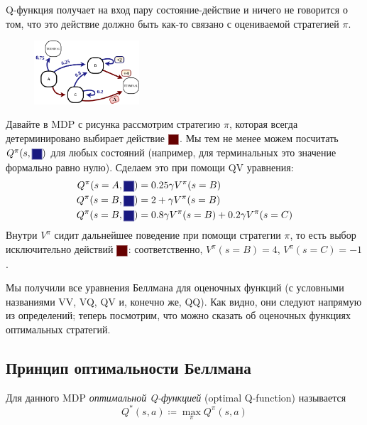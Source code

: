\begin{example}
Q-функция получает на вход пару состояние-действие и ничего не говорится о том, что это действие должно быть как-то связано с оцениваемой стратегией $\pi$. 

\begin{figure}
\vspace{-0.2cm}
\centering
\includegraphics[width=0.35\textwidth]{Images/OptimalQ.png}
\vspace{-1.3cm}
\end{figure}

Давайте в MDP с рисунка рассмотрим стратегию $\pi$, которая всегда детерминировано выбирает действие $\colorsquare{ChadRed}$. Мы тем не менее можем посчитать $Q^\pi(s, \colorsquare{ChadBlue})$ для любых состояний (например, для терминальных это значение формально равно нулю). Сделаем это при помощи QV уравнения:
\begin{align*} 
Q^\pi(s = A, \colorsquare{ChadBlue}) &= 0.25 \gamma V^\pi(s = B) \\ 
Q^\pi(s = B, \colorsquare{ChadBlue}) &= 2 + \gamma V^\pi(s = B) \\
Q^\pi(s = B, \colorsquare{ChadBlue}) &= 0.8 \gamma V^\pi(s = B) + 0.2 \gamma V^\pi(s = C)
\end{align*}
Внутри $V^\pi$ сидит дальнейшее поведение при помощи стратегии $\pi$, то есть выбор исключительно действий $\colorsquare{ChadRed}$: соответственно, $V^\pi(s = B) = 4$, $V^\pi(s = C) = -1$.
\end{example}

Мы получили все уравнения Беллмана для оценочных функций (с условными названиями VV, VQ, QV и, конечно же, QQ). Как видно, они следуют напрямую из определений; теперь посмотрим, что можно сказать об оценочных функциях оптимальных стратегий.

\subsection{Принцип оптимальности Беллмана}

\begin{definition}
Для данного MDP \emph{оптимальной Q-функцией} (optimal Q-function) называется
\begin{equation}\label{optimalQdefinition}
Q^*(s, a) \coloneqq \max_\pi Q^\pi(s, a)
\end{equation}
\end{definition}

